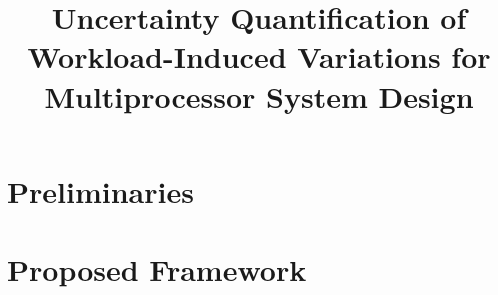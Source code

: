 \documentclass{sig-alternate}
\begin{document}
  \title{Uncertainty Quantification of Workload-Induced Variations for Multiprocessor System Design}

  \maketitle

  \begin{abstract}
    
  \end{abstract}

  \section{Preliminaries}
  

  \section{Proposed Framework}
  


  \printbibliography

  \appendix
  
\end{document}
